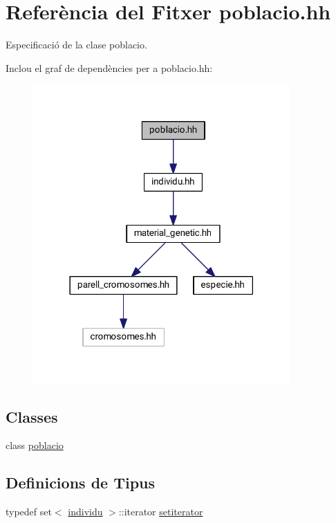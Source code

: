 \hypertarget{poblacio_8hh}{}\section{Referència del Fitxer poblacio.\+hh}
\label{poblacio_8hh}


Especificació de la clase poblacio.  


Inclou el graf de dependències per a poblacio.\+hh\+:\nopagebreak
\begin{figure}[H]
\begin{center}
\leavevmode
\includegraphics[width=278pt]{poblacio_8hh__incl}
\end{center}
\end{figure}
\subsection*{Classes}
\begin{DoxyCompactItemize}
\item 
class \hyperlink{classpoblacio}{poblacio}
\end{DoxyCompactItemize}
\subsection*{Definicions de Tipus}
\begin{DoxyCompactItemize}
\item 
typedef set$<$ \hyperlink{classindividu}{individu} $>$\+::iterator \hyperlink{poblacio_8hh_a54fb6ab8ec9e9336d208b860dca1513d}{setiterator}
\end{DoxyCompactItemize}


